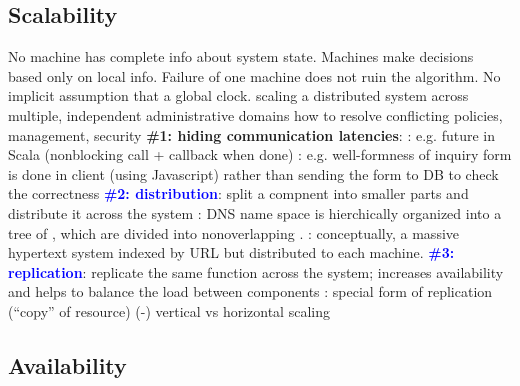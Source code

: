 \documentclass{note}
\begin{document}
\subsection{Scalability}
\bit
\w {}
    \ben
    \w \textcolor{blue2}{No machine has complete info about system
      state.} 
    \w \textcolor{blue2}{Machines make decisions based only on local info.}
    \w \textcolor{blue2}{Failure of one machine does not ruin the algorithm.}
    \w \textcolor{blue2}{No implicit assumption that a global clock.}
    \een
\w scaling a distributed system across multiple, independent
  administrative domains
\w how to resolve conflicting policies, management, security
\w \bb{\textcolor{red2}{SCALING TECHNIQUES}} 
  \bit
  \w \textcolor{blue2}{\bf{}\#1: hiding communication latencies}:
    \bit
    \w {}: e.g. future in Scala (nonblocking call +
    callback when done)
    \w {}: e.g. well-formness of inquiry
    form is done in client (using Javascript) rather than sending the form to
    DB to check the correctness
    \eit
  \w \textcolor{blue}{\bf{}\#2: distribution}: split a compnent into smaller
  parts and distribute it across the system
    \bit
    \w {}: DNS name space is hierchically organized into a tree of
    , which are divided into nonoverlapping .
    \w {}: conceptually, a massive hypertext system indexed by
    URL but distributed to each machine.
    \eit
  \w \textcolor{blue}{\bf{}\#3: replication}: replicate the same function
  across the system; increases availability and helps to balance the load
  between components
    \bit
    \w {}: special form of replication (``copy'' of resource)
    \w (-) 
    \eit
  \eit
\w vertical vs horizontal scaling
\eit
\subsection{Availability} 
\end{document}
